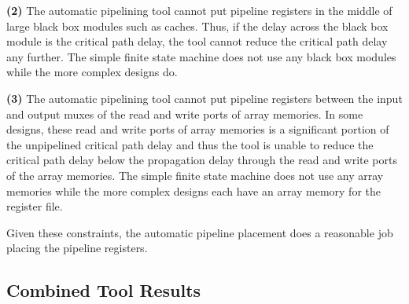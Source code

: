 {\bf (2)}  
The automatic pipelining tool cannot put pipeline registers in the middle of large black box modules such as caches. Thus, if the delay across the black box module is the critical path delay, the tool cannot reduce the critical path delay any further. The simple finite state machine does not use any black box modules while the more complex designs do.

{\bf (3)} 
The automatic pipelining tool cannot put pipeline registers between the input and output muxes of the read and write ports of array memories. In some designs, these read and write ports of array memories is a significant portion of the unpipelined critical path delay and thus the tool is unable to reduce the critical path delay below the propagation delay through the read and write ports of the array memories. The simple finite state machine does not use any array memories while the more complex designs each have an array memory for the register file.

Given these constraints, the automatic pipeline placement does a reasonable job placing the pipeline registers.
\subsection{Combined Tool Results}
\begin{table}[htb]
	\centering
	\caption{{\bf 2 Stage Pipelined Design Delay Data} The delays are in units of ns and are obtained from post-synthesis data.}
	\label{fig:comb_delays2}
\end{table}

